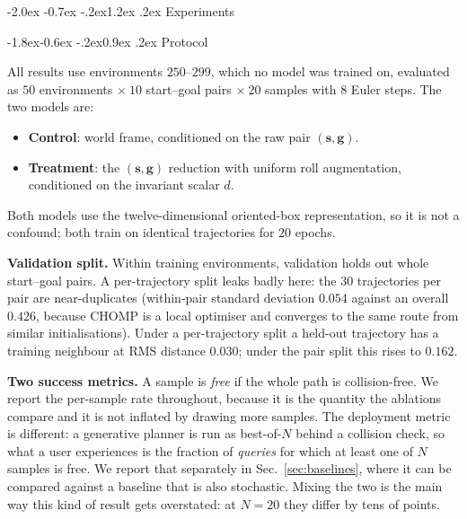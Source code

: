\documentclass[10pt,twocolumn,letterpaper]{article}
\makeatletter
\renewcommand\section{\@startsection{section}{1}{\z@}%
  {-2.0ex \@plus -0.7ex \@minus -.2ex}{1.2ex \@plus.2ex}%
  {\centering\normalfont\large\bfseries}}
\renewcommand\subsection{\@startsection{subsection}{2}{\z@}%
  {-1.8ex\@plus -0.6ex \@minus -.2ex}{0.9ex \@plus .2ex}%
  {\normalfont\normalsize\bfseries}}
\theoremstyle{plain}
\newcommand{\svec}{\mathbf{s}}
\newcommand{\gvec}{\mathbf{g}}
\makeatother
\begin{document}
\section{Experiments}

\subsection{Protocol}

All results use environments $250$--$299$, which no model was trained on,
evaluated as $50$ environments $\times\ 10$ start--goal pairs $\times\ 20$ samples
with $8$ Euler steps. The two models are:

\begin{itemize}\itemsep2pt
  \item \textbf{Control}: world frame, conditioned on the raw pair $(\svec,\gvec)$.
  \item \textbf{Treatment}: the $(\svec,\gvec)$ reduction with uniform roll
        augmentation, conditioned on the invariant scalar $d$.
\end{itemize}

Both models use the twelve-dimensional oriented-box representation, so it is not a
confound; both train on identical trajectories for $20$ epochs.

\textbf{Validation split.} Within training environments, validation holds out
whole start--goal pairs. A per-trajectory split leaks badly here: the $30$
trajectories per pair are near-duplicates (within-pair standard deviation $0.054$
against an overall $0.426$, because CHOMP is a local optimiser and converges to
the same route from similar initialisations). Under a per-trajectory split a
held-out trajectory has a training neighbour at RMS distance $0.030$; under the
pair split this rises to $0.162$.

\textbf{Two success metrics.} A sample is \emph{free} if the whole path is
collision-free. We report the per-sample rate throughout, because it is the
quantity the ablations compare and it is not inflated by drawing more samples.
The deployment metric is different: a generative planner is run as best-of-$N$
behind a collision check, so what a user experiences is the fraction of
\emph{queries} for which at least one of $N$ samples is free. We report that
separately in Sec.~\ref{sec:baselines}, where it can be compared against a
baseline that is also stochastic. Mixing the two is the main way this kind of
result gets overstated: at $N=20$ they differ by tens of points.
\end{document}
